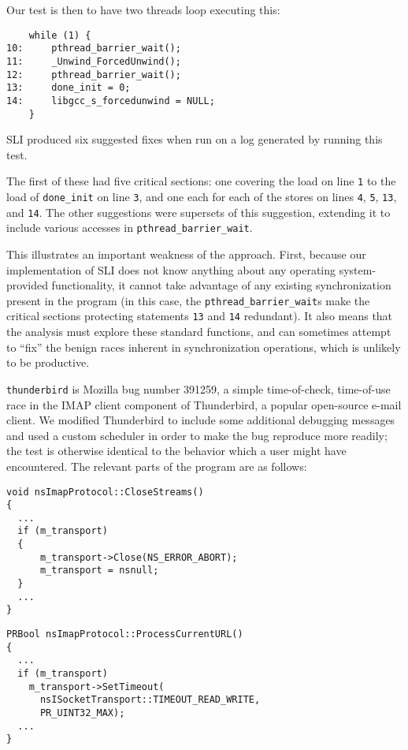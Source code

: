 \documentclass[10pt,twocolumn,preprint,natbib,authoryear]{sigplanconf}
\begin{document}
Our test is then to have two threads loop executing this:

\begin{verbatim}
    while (1) {
10:     pthread_barrier_wait();
11:     _Unwind_ForcedUnwind();
12:     pthread_barrier_wait();
13:     done_init = 0;
14:     libgcc_s_forcedunwind = NULL;
    }
\end{verbatim}

SLI produced six suggested fixes when run on a log generated by
running this test.

The first of these had five critical sections: one covering the load
on line \verb|1| to the load of \verb|done_init| on line \verb|3|, and
one each for each of the stores on lines \verb|4|, \verb|5|,
\verb|13|, and \verb|14|.  The other suggestions were supersets of
this suggestion, extending it to include various accesses in
\verb|pthread_barrier_wait|.

This illustrates an important weakness of the approach.  First,
because our implementation of SLI does not know anything about any
operating system-provided functionality, it cannot take advantage of
any existing synchronization present in the program (in this case, the
\verb|pthread_barrier_wait|s make the critical sections protecting
statements \verb|13| and \verb|14| redundant).  It also means that the
analysis must explore these standard functions, and can sometimes
attempt to ``fix'' the benign races inherent in synchronization
operations, which is unlikely to be productive.

\verb|thunderbird| is Mozilla bug number
391259\cite{thunderbird39125}, a simple time-of-check, time-of-use
race in the IMAP client component of Thunderbird, a popular
open-source e-mail client.  We modified Thunderbird to include some
additional debugging messages and used a custom scheduler in order to
make the bug reproduce more readily; the test is otherwise identical
to the behavior which a user might have encountered.  The relevant
parts of the program are as follows:

\begin{verbatim}
void nsImapProtocol::CloseStreams()
{
  ...
  if (m_transport)
  {
      m_transport->Close(NS_ERROR_ABORT);
      m_transport = nsnull;
  }
  ...
}
\end{verbatim}

\begin{verbatim}
PRBool nsImapProtocol::ProcessCurrentURL()
{
  ...
  if (m_transport)
    m_transport->SetTimeout(
      nsISocketTransport::TIMEOUT_READ_WRITE,
      PR_UINT32_MAX);
  ...
}
\end{verbatim}
\end{document}
